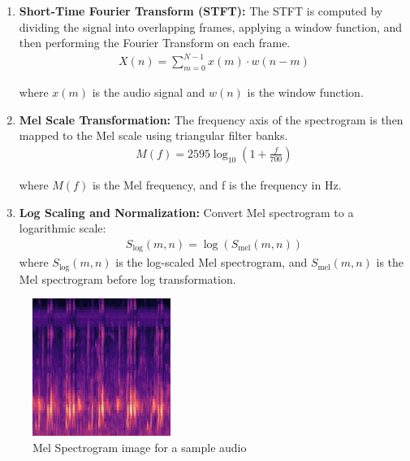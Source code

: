      \begin{enumerate}
        \item \textbf{Short-Time Fourier Transform (STFT):} The STFT is computed by dividing the signal into overlapping frames, applying a window function, and then performing the Fourier Transform on each frame.
        \begin{eqnarray}
            X(n) = \sum_{m=0}^{N-1} x(m) \cdot w(n-m)
            \end{eqnarray}
      
            where \( x(m) \) is the audio signal and \( w(n) \) is the window function.
        \item \textbf{Mel Scale Transformation:}
        The frequency axis of the spectrogram is then mapped to the Mel scale using triangular filter banks.
        \begin{eqnarray}
            M(f) = 2595 \log_{10} \left(1 + \frac{f}{700} \right)
            \end{eqnarray}
      
            where \( M(f) \) is the Mel frequency, and f is the frequency in Hz.
            
        \item \textbf{Log Scaling and Normalization:}
        Convert Mel spectrogram to a logarithmic scale:
        \begin{eqnarray}
            S_{\text{log}}(m, n) = \log \left( S_{\text{mel}}(m, n) \right)
            \end{eqnarray}
            where \( S_{\text{log}}(m, n) \) is the log-scaled Mel spectrogram, and \( S_{\text{mel}}(m, n) \) is the Mel spectrogram before log transformation.
      \end{enumerate}

      \begin{figure}[h!]
            \centering
            \includegraphics[width=0.4\textwidth]{images/koel_mel_spectrogram.jpg}
            \caption{Mel Spectrogram image for a sample audio}
            \label{fig:mel_spectrogram_sample}
      \end{figure}

